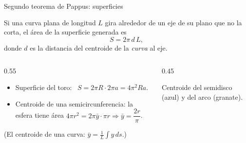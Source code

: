 \documentclass[10pt,aspectratio=169]{beamer}
\begin{document}
\begin{frame}{Segundo teorema de Pappus: superficies}
  \begin{teorema}
    Si una curva plana de longitud $L$ gira alrededor de un eje de su plano que no la corta, el área de la superficie generada es
    \[ S=2\pi\,d\,L, \]
    donde $d$ es la distancia del centroide de la \emph{curva} al eje.
  \end{teorema}
  \begin{columns}
    \begin{column}{0.55\textwidth}
      \begin{ejemplo}[11]
        \begin{itemize}
          \item Superficie del toro: \ $S=2\pi R\cdot2\pi a=4\pi^2Ra$.
          \item Centroide de una semicircunferencia: la esfera tiene área $4\pi r^2=2\pi\bar y\cdot\pi r\Rightarrow\bar y=\dfrac{2r}{\pi}$.
        \end{itemize}
      \end{ejemplo}
      \small (El centroide de una curva: $\bar y=\frac1L\int y\,ds$.)
    \end{column}
    \begin{column}{0.45\textwidth}
      \centering

      \small Centroide del semidisco (azul) y del arco (granate).
    \end{column}
  \end{columns}
\end{frame}
\end{document}
